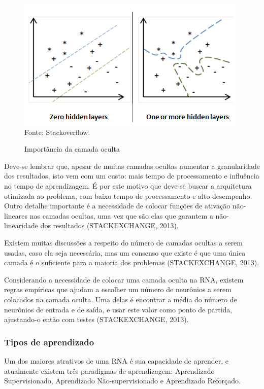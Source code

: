\documentclass[12pt,a4paper]{article}
\newcommand{\source}[1]{\small Fonte: {#1}}
\begin{document}
	\begin{figure}[ht!]
		\caption{Importância da camada oculta}
		\centering
		\includegraphics[scale=1.5]{HiddenLayers.png}\\
		\vspace{0.5mm}
		\source{Stackoverflow.}
		\label{fig:nnhiddenlayer}
	\end{figure}
	
	Deve-se lembrar que, apesar de muitas camadas ocultas aumentar a granularidade dos resultados,
	isto vem com um custo:
	mais tempo de processamento e
	influência no tempo de aprendizagem.
	É por este motivo que deve-se buscar a arquitetura otimizada ao problema,
	com baixo tempo de processamento e alto desempenho.
	Outro detalhe importante é a necessidade de colocar funções de ativação não-lineares nas camadas ocultas,
	uma vez que são elas que garantem a não-linearidade dos resultados
	(STACKEXCHANGE, 2013).
	
	Existem muitas discussões a respeito do número de camadas ocultas a serem usadas, caso ela seja necessária,
	mas um consenso que existe é que uma única camada é o suficiente para a maioria dos problemas
	(STACKEXCHANGE, 2013).
	
	Considerando a necessidade de colocar uma camada oculta na RNA,
	existem regras empíricas que ajudam a escolher um número de neurônios a serem colocados na camada oculta.
	Uma delas é encontrar a média do número de neurônios de entrada e de saída,
	e usar este valor como ponto de partida,
	ajustando-o então com testes
	(STACKEXCHANGE, 2013).
	
	\subsubsection{Tipos de aprendizado}
	Um dos maiores atrativos de uma RNA é sua capacidade de aprender,
	e atualmente existem três paradigmas de aprendizagem:
	Aprendizado Supervisionado, Aprendizado Não-supervisionado e Aprendizado Reforçado.
	
\end{document}
